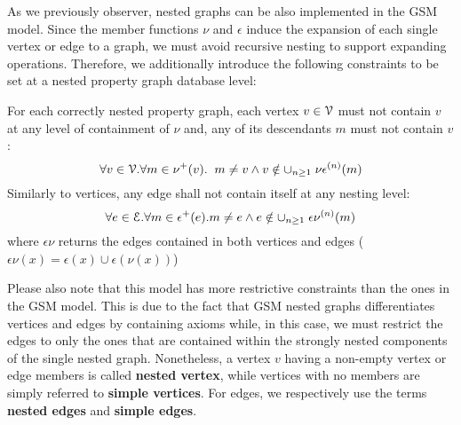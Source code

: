 As we previously observer, nested graphs can be also implemented in the GSM model. Since the member functions $\nu$ and $\epsilon$ induce the expansion of each single vertex or edge to a graph, we must avoid recursive nesting to support expanding operations.
Therefore, we additionally introduce the following constraints to be set at a nested property graph database level:

\begin{axiom}
	For each correctly nested property graph, each vertex $v\in \mathcal{V}$ must not contain $v$ at any level of containment of $\nu$ and, any of its descendants $m$ must not contain $v$:
	\[\forall v\in \mathcal{V}. \forall m\in \nu^+(v).\;\; m\neq v\wedge v\notin \cup_{n\geq 1}\;{\nu\epsilon}^{(n)}(m)\]
	Similarly to vertices, any edge shall not contain itself at any nesting level:
	\[\forall e\in \mathcal{E}. \forall m\in \epsilon^+(e). m\neq e\wedge e\notin \cup_{n\geq 1}\;{\epsilon\nu}^{(n)}(m)\]
	where ${\epsilon\nu}$ returns the edges contained in both vertices and edges ($\epsilon\nu(x)=\epsilon(x)\cup \epsilon(\nu(x))$)
\end{axiom}

Please also note that this model has more restrictive constraints than the ones in the GSM model. This is due to the fact that GSM nested graphs differentiates vertices and edges by containing axioms while, in this case, we must restrict the edges to only the ones that are contained within the strongly nested components of the single nested graph. Nonetheless, a vertex $v$ having a non-empty vertex or edge members is called \textbf{nested vertex}, while vertices with no members are simply referred to \textbf{simple vertices}. For edges, we respectively use the terms \textbf{nested edges} and \textbf{simple edges}. 

